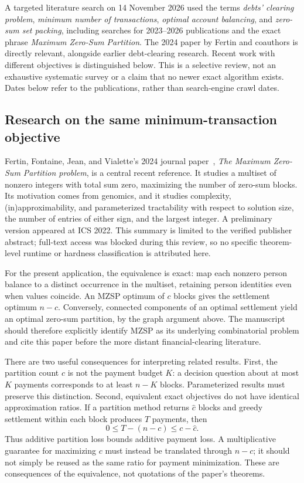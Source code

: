 \documentclass[11pt]{article}
\begin{document}
A targeted literature search on 14 November 2026 used the terms
\emph{debts' clearing problem}, \emph{minimum number of transactions},
\emph{optimal account balancing}, and \emph{zero-sum set packing},
including searches for 2023--2026 publications and the exact phrase
\emph{Maximum Zero-Sum Partition}. The 2024 paper by Fertin and
coauthors is directly relevant, alongside earlier debt-clearing research.
Recent work with different objectives is distinguished below.
This is a selective review, not an exhaustive systematic
survey or a claim that no newer exact algorithm exists. Dates below
refer to the publications, rather than search-engine crawl dates.

\subsection{Research on the same minimum-transaction objective}

Fertin, Fontaine, Jean, and Vialette's 2024 journal
paper~\cite{fertin2024}, \emph{The Maximum Zero-Sum Partition problem},
is a central recent reference. It studies a multiset of nonzero integers
with total sum zero, maximizing the number of zero-sum blocks. Its
motivation comes from genomics, and it studies complexity,
(in)approximability, and parameterized tractability with respect to
solution size, the number of entries of either sign, and the largest
integer. A preliminary version appeared at ICS 2022. This summary is
limited to the verified publisher abstract; full-text access was blocked
during this review, so no specific theorem-level runtime or hardness
classification is attributed here.

For the present application, the equivalence is exact: map each nonzero
person balance to a distinct occurrence in the multiset, retaining person
identities even when values coincide. An MZSP optimum of $c$ blocks gives
the settlement optimum $n-c$. Conversely, connected components of an
optimal settlement yield an optimal zero-sum partition, by the graph
argument above. The manuscript should therefore explicitly identify MZSP
as its underlying combinatorial problem and cite this paper before the
more distant financial-clearing literature.

There are two useful consequences for interpreting related results.
First, the partition count $c$ is not the payment budget $K$: a decision
question about at most $K$ payments corresponds to at least $n-K$ blocks.
Parameterized results must preserve this distinction. Second, equivalent
exact objectives do not have identical approximation ratios. If a
partition method returns $\widehat c$ blocks and greedy settlement within
each block produces $T$ payments, then
\[
 0\leq T-(n-c)\leq c-\widehat c.
\]
Thus additive partition loss bounds additive payment loss. A multiplicative
guarantee for maximizing $c$ must instead be translated through $n-c$;
it should not simply be reused as the same ratio for payment minimization.
These are consequences of the equivalence, not quotations of the paper's
theorems.
\end{document}
